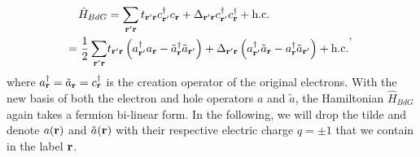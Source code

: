 \documentclass[amsmath,amssymb, aps, prl, twocolumn]{revtex4-1}
\begin{document}
\begin{equation}
\left. \begin{aligned}
\hat{H}_{BdG} & =  \sum_{\bf{r}'\bf{r}}t_{\bf{r}'\bf{r}}c_{\bf{r}'}^{\dagger}c_{\bf{r}}+\Delta_{\bf{r}'\bf{r}}c_{\bf{r}'}^{\dagger}c_{\bf{r}}^{\dagger}+\mbox{h.c.}\\
=\frac{1}{2}\sum_{\bf{r}'\bf{r}}&t_{\bf{r}'\bf{r}}\left(a_{\bf{r}'}^{\dagger}a_{\bf{r}}-\tilde{a}_{\bf{r}}^{\dagger}\tilde{a}_{\bf{r}'}\right)
+\Delta_{\bf{r}'\bf{r}}\left(a_{\bf{r}'}^{\dagger}\tilde{a}_{\bf{r}}-a_{\bf{r}}^{\dagger}\tilde{a}_{\bf{r}'}\right)+\mbox{h.c.}
\end{aligned},
\right.
\end{equation}
where $a_{\bf{r}}^\dagger=\tilde{a}_{\bf{r}}=c_{\bf{r}}^\dagger$ is the creation operator of the original electrons. With the new basis of both the electron and hole operators $a$ and $\tilde{a}$, the Hamiltonian $\hat{H}_{BdG}$ again takes a fermion bi-linear form. In the following, we will drop the tilde and denote $a(\bf{r})$ and $\tilde{a}(\bf{r})$ with their respective electric charge $q=\pm 1$ that we contain in the label $\bf{r}$.
\end{document}
